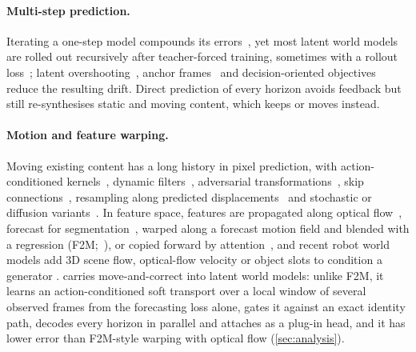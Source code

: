 \paragraph{Multi-step prediction.}
Iterating a one-step model compounds its errors~\citep{venkatraman2015multistep}, yet most latent world models are rolled
out recursively after teacher-forced training, sometimes with a rollout loss~\citep{zhou2025dinowm,assran2025vjepa2};
latent overshooting~\citep{hafner2019planet}, anchor frames~\citep{luan2026anchorednwm} and decision-oriented
objectives~\citep{wang2026dalewm} reduce the resulting drift.
%
Direct prediction of every horizon avoids feedback but still re-synthesises static and moving content, which \ours{}
keeps or moves instead.

\paragraph{Motion and feature warping.}
Moving existing content has a long history in pixel prediction, with action-conditioned kernels~\citep{finn2016advection},
dynamic filters~\citep{debrabandere2016dfn}, adversarial transformations~\citep{vondrick2017transformers}, skip
connections~\citep{ebert2017skip}, resampling along predicted displacements~\citep{reda2018sdcnet,liu2017voxelflow} and
stochastic or diffusion variants~\citep{lee2018savp,voleti2022mcvd}.
%
In feature space, features are propagated along optical flow~\citep{zhu2017dff}, forecast for
segmentation~\citep{luc2017deeper,luc2018f2f}, warped along a forecast motion field and blended with a regression
(F2M;~\citealp{saric2020warp}), or copied forward by attention~\citep{oh2019stm}, and recent robot world models add 3D
scene flow, optical-flow velocity or object slots to condition a generator
\citep{guo2026flowdreamer,syed2026ahead,wu2023slotformer,mosbach2025sold}.
%
\ours{} carries move-and-correct into latent world models: unlike F2M, it learns an action-conditioned soft transport
over a local window of several observed frames from the forecasting loss alone, gates it against an exact identity
path, decodes every horizon in parallel and attaches as a plug-in head, and it has lower error than F2M-style warping
with optical flow (\cref{sec:analysis}).
